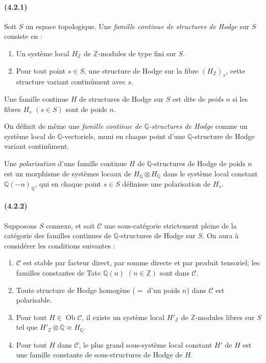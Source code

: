 \documentclass[10pt]{article}
\newcommand{\Q}{\mathbb Q}
\newcommand{\Z}{\mathbb Z}
\newcommand{\Ob}{\operatorname{Ob}}
\begin{document}
\paragraph{(4.2.1)} Soit $S$ un espace topologique. Une \emph{famille continue de structures de Hodge} sur $S$ consiste en :
\begin{enumerate}[label=\alph*)]
\item Un système local $H_\Z$ de $\Z$-modules de type fini sur $S$.
\item Pour tout point $s\in S$, une structure de Hodge sur la fibre $(H_\Z)_s$, cette structure variant continûment avec $s$.
\end{enumerate}
Une famille continue $H$ de structures de Hodge sur $S$ est dite de \emph{poids $n$} si les fibres $H_s$ $(s\in S)$ sont de poids $n$.

On définit de même une \emph{famille continue de $\Q$-structures de Hodge} comme un système local de $\Q$-vectoriels, muni en chaque point d'une $\Q$-structure de Hodge variant continûment.

Une \emph{polarisation} d'une famille continue $H$ de $\Q$-structures de Hodge de poids $n$ est un morphisme de systèmes locaux de $H_\Q\otimes H_\Q$ dans le système local constant $\Q(-n)_\Q$, qui en chaque point $s\in S$ définisse une polarisation de $H_s$.

\paragraph{(4.2.2)} Supposons $S$ connexe, et soit $\mathcal C$ une sous-catégorie strictement pleine de la catégorie des familles continues de $\Q$-structures de Hodge sur $S$. On aura à considérer les conditions suivantes :
\begin{enumerate}[label=(4.2.2.\arabic*)]
\item $\mathcal C$ est stable par facteur direct, par somme directe et par produit tensoriel; les familles constantes de Tate $\Q(n)$ $(n\in\Z)$ sont dans $\mathcal C$.
\item Toute structure de Hodge homogène ($={}$ d'un poids $n$) dans $\mathcal C$ est polarisable.
\item Pour tout $H\in\Ob\mathcal C$, il existe un système local $H'_\Z$ de $\Z$-modules libres sur $S$ tel que $H'_\Z\otimes\Q\approx H_\Q$.
\item Pour tout $H$ dans $\mathcal C$, le plus grand sous-système local constant $H'$ de $H$ est une famille constante de sous-structures de Hodge de $H$.
\end{enumerate}
\end{document}
